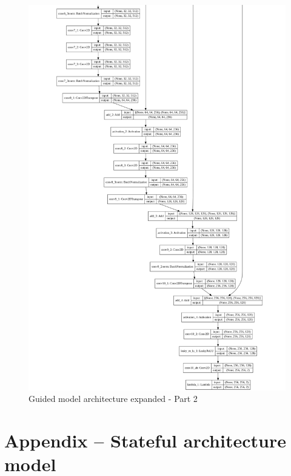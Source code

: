 \documentclass[12pt,openright,oneside,a4paper,english]{abntex2}
\begin{document}
\begin{otherlanguage}{english}
\begin{figure}[!htb]
\centering
\includegraphics[height=\textheight]{model_plot/Guided2}
\caption{Guided model architecture expanded - Part 2}
\label{guided_plot_2}
\end{figure}

\chapter{Appendix -- Stateful architecture model}


\end{otherlanguage}
\end{document}

